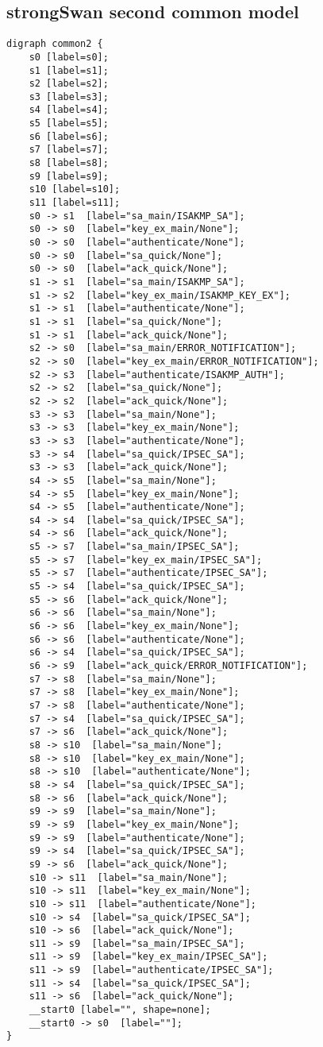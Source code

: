 \subsection*{strongSwan second common model}
\begin{lstlisting}[numbers=none]
digraph common2 {
	s0 [label=s0];
	s1 [label=s1];
	s2 [label=s2];
	s3 [label=s3];
	s4 [label=s4];
	s5 [label=s5];
	s6 [label=s6];
	s7 [label=s7];
	s8 [label=s8];
	s9 [label=s9];
	s10 [label=s10];
	s11 [label=s11];
	s0 -> s1  [label="sa_main/ISAKMP_SA"];
	s0 -> s0  [label="key_ex_main/None"];
	s0 -> s0  [label="authenticate/None"];
	s0 -> s0  [label="sa_quick/None"];
	s0 -> s0  [label="ack_quick/None"];
	s1 -> s1  [label="sa_main/ISAKMP_SA"];
	s1 -> s2  [label="key_ex_main/ISAKMP_KEY_EX"];
	s1 -> s1  [label="authenticate/None"];
	s1 -> s1  [label="sa_quick/None"];
	s1 -> s1  [label="ack_quick/None"];
	s2 -> s0  [label="sa_main/ERROR_NOTIFICATION"];
	s2 -> s0  [label="key_ex_main/ERROR_NOTIFICATION"];
	s2 -> s3  [label="authenticate/ISAKMP_AUTH"];
	s2 -> s2  [label="sa_quick/None"];
	s2 -> s2  [label="ack_quick/None"];
	s3 -> s3  [label="sa_main/None"];
	s3 -> s3  [label="key_ex_main/None"];
	s3 -> s3  [label="authenticate/None"];
	s3 -> s4  [label="sa_quick/IPSEC_SA"];
	s3 -> s3  [label="ack_quick/None"];
	s4 -> s5  [label="sa_main/None"];
	s4 -> s5  [label="key_ex_main/None"];
	s4 -> s5  [label="authenticate/None"];
	s4 -> s4  [label="sa_quick/IPSEC_SA"];
	s4 -> s6  [label="ack_quick/None"];
	s5 -> s7  [label="sa_main/IPSEC_SA"];
	s5 -> s7  [label="key_ex_main/IPSEC_SA"];
	s5 -> s7  [label="authenticate/IPSEC_SA"];
	s5 -> s4  [label="sa_quick/IPSEC_SA"];
	s5 -> s6  [label="ack_quick/None"];
	s6 -> s6  [label="sa_main/None"];
	s6 -> s6  [label="key_ex_main/None"];
	s6 -> s6  [label="authenticate/None"];
	s6 -> s4  [label="sa_quick/IPSEC_SA"];
	s6 -> s9  [label="ack_quick/ERROR_NOTIFICATION"];
	s7 -> s8  [label="sa_main/None"];
	s7 -> s8  [label="key_ex_main/None"];
	s7 -> s8  [label="authenticate/None"];
	s7 -> s4  [label="sa_quick/IPSEC_SA"];
	s7 -> s6  [label="ack_quick/None"];
	s8 -> s10  [label="sa_main/None"];
	s8 -> s10  [label="key_ex_main/None"];
	s8 -> s10  [label="authenticate/None"];
	s8 -> s4  [label="sa_quick/IPSEC_SA"];
	s8 -> s6  [label="ack_quick/None"];
	s9 -> s9  [label="sa_main/None"];
	s9 -> s9  [label="key_ex_main/None"];
	s9 -> s9  [label="authenticate/None"];
	s9 -> s4  [label="sa_quick/IPSEC_SA"];
	s9 -> s6  [label="ack_quick/None"];
	s10 -> s11  [label="sa_main/None"];
	s10 -> s11  [label="key_ex_main/None"];
	s10 -> s11  [label="authenticate/None"];
	s10 -> s4  [label="sa_quick/IPSEC_SA"];
	s10 -> s6  [label="ack_quick/None"];
	s11 -> s9  [label="sa_main/IPSEC_SA"];
	s11 -> s9  [label="key_ex_main/IPSEC_SA"];
	s11 -> s9  [label="authenticate/IPSEC_SA"];
	s11 -> s4  [label="sa_quick/IPSEC_SA"];
	s11 -> s6  [label="ack_quick/None"];
	__start0 [label="", shape=none];
	__start0 -> s0  [label=""];
}
\end{lstlisting}
\newpage